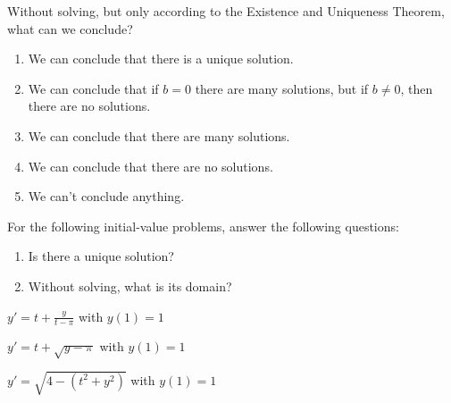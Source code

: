 Without solving, but only according to the Existence and Uniqueness Theorem, what can we conclude?
\begin{enumerate}[label=\color{gray}(\alph*)]
	\item We can conclude that there is a unique solution.
	\item We can conclude that if $b=0$ there are many solutions, but if $b\neq 0$, then there are no solutions.
	\item We can conclude that there are many solutions.
	\item We can conclude that there are no solutions.
	\item We can't conclude anything.
\end{enumerate}




\bookonlynewpage

\question For the following initial-value problems, answer the following questions:
\begin{enumerate}[label=\color{gray}(\alph*)]
\item Is there a unique solution?

\item Without solving, what is its domain?
\end{enumerate}
\begin{parts}
	\item $y' = t + \frac{y}{t-\pi}$ with $y(1) = 1$
	\item $y' = t + \sqrt{y-\pi}$ with $y(1) = 1$
	\item $y' = \sqrt{4 - (t^2+y^2)}$ with $y(1) = 1$
\end{parts}






\bookonlynewpage

